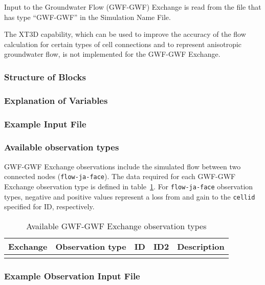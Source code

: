 Input to the Groundwater Flow (GWF-GWF) Exchange is read from the file that has type ``GWF-GWF'' in the Simulation Name File.

The XT3D capability, which can be used to improve the accuracy of the flow calculation for certain types of cell connections and to represent anisotropic groundwater flow, is not implemented for the GWF-GWF Exchange.

\vspace{5mm}
\subsubsection{Structure of Blocks}




\vspace{5mm}
\subsubsection{Explanation of Variables}
\begin{description}

\end{description}

\vspace{5mm}
\subsubsection{Example Input File}


\vspace{5mm}
\subsubsection{Available observation types}
GWF-GWF Exchange observations include the simulated flow between two connected nodes (\texttt{flow-ja-face}). The data required for each GWF-GWF Exchange observation type is defined in table~\ref{table:gwf-gwfobstype}. For \texttt{flow-ja-face} observation types, negative and positive values represent a loss from and gain to the \texttt{cellid} specified for ID, respectively.

\begin{longtable}{p{2cm} p{2.75cm} p{2cm} p{1.25cm} p{7cm}}
\caption{Available GWF-GWF Exchange observation types} \tabularnewline

\hline
\hline
\textbf{Exchange} & \textbf{Observation type} & \textbf{ID} & \textbf{ID2} & \textbf{Description} \\
\hline
\endhead

\hline
\endfoot


\label{table:gwf-gwfobstype}
\end{longtable}


\vspace{5mm}
\subsubsection{Example Observation Input File}


